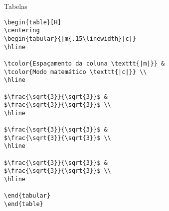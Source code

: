 \begin{task}{Tabelas}
\begin{verbatim}
\begin{table}[H]
\centering
\begin{tabular}{|m{.15\linewidth}|c|}
\hline

\tcolor{Espaçamento da coluna \texttt{|m|}} & 
\tcolor{Modo matemático \texttt{|c|}} \\
\hline

$\frac{\sqrt{3}}{\sqrt{3}}$ & 
$\frac{\sqrt{3}}{\sqrt{3}}$ \\
\hline

$\frac{\sqrt{3}}{\sqrt{3}}$ & 
$\frac{\sqrt{3}}{\sqrt{3}}$ \\
\hline

$\frac{\sqrt{3}}{\sqrt{3}}$ & 
$\frac{\sqrt{3}}{\sqrt{3}}$ \\
\hline

\end{tabular}
\end{table}
\end{verbatim}

\end{task}


